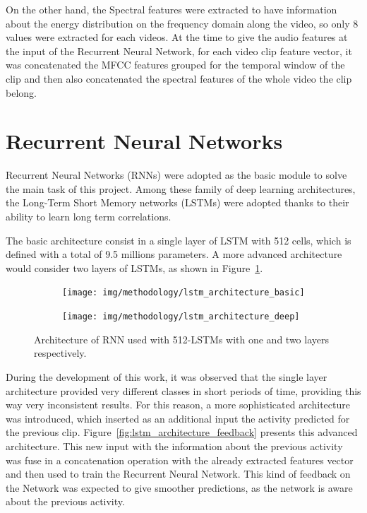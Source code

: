 On the other hand, the Spectral features were extracted to have information about the energy distribution on the frequency domain along the video, so only 8 values were extracted for each videos. At the time to give the audio features at the input of the Recurrent Neural Network, for each video clip feature vector, it was concatenated the MFCC features grouped for the temporal window of the clip and then also concatenated the spectral features of the whole video the clip belong.

\section{Recurrent Neural Networks}

Recurrent Neural Networks (RNNs) were adopted as the basic module to solve the main task of this project. Among these family of deep learning architectures, the Long-Term Short Memory networks (LSTMs) were adopted thanks to their ability to learn long term correlations.

The basic architecture consist in a single layer of LSTM with 512 cells, which is defined with a total of 9.5 millions parameters. A more advanced architecture would consider two layers of LSTMs, as shown in  Figure~\ref{fig:lstm_architecture}.

\begin{figure}[H]
\centering
\begin{subfigure}[b]{.5\textwidth}
  \centering
  \texttt{[image: img/methodology/lstm\_architecture\_basic]}
\end{subfigure}%
\begin{subfigure}[b]{.5\textwidth}
  \centering
  \texttt{[image: img/methodology/lstm\_architecture\_deep]}
\end{subfigure}
\caption{Architecture of RNN used with 512-LSTMs with one and two layers respectively.}
\label{fig:lstm_architecture}
\end{figure}

During the development of this work, it was observed that the single layer architecture provided very different classes in short periods of time, providing this way very inconsistent results. For this reason, a more sophisticated architecture was introduced, which inserted as an additional input the activity predicted for the previous clip.
Figure~\ref{fig:lstm_architecture_feedback} presents this advanced architecture.
This new input with the information about the previous activity was fuse in a concatenation operation with the already extracted features vector and then used to train the Recurrent Neural Network. This kind of feedback on the Network was expected to give smoother predictions, as the network is aware about the previous activity.

